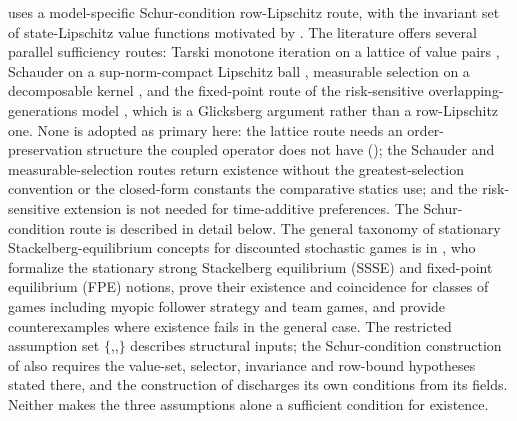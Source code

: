  uses a model-specific Schur-condition
row-Lipschitz route, with the invariant set of state-Lipschitz value functions
motivated by \citet{Curtat1996}. The literature offers several parallel sufficiency routes: Tarski
monotone iteration on a lattice of value pairs
\citep{BalbusReffettWozny2014JET,Vives1990}, Schauder on a sup-norm-compact
Lipschitz ball \citep{RaadWozny2019}, measurable selection on a decomposable
kernel \citep{HeSun2017}, and the fixed-point route of the risk-sensitive
overlapping-generations model \citep{JaskiewiczNowak2014}, which is a Glicksberg argument rather than a row-Lipschitz one. None is adopted as primary
here: the lattice route needs an order-preservation structure the coupled
operator does not have (); the Schauder and
measurable-selection routes return existence without the greatest-selection
convention or the closed-form constants the comparative statics use; and the
risk-sensitive extension is not needed for time-additive preferences. The
Schur-condition route is described in detail below. The general taxonomy of stationary
Stackelberg-equilibrium concepts for discounted stochastic games is
in \citet{Bucarey2023}, who formalize the stationary strong
Stackelberg equilibrium (SSSE) and fixed-point equilibrium (FPE)
notions, prove their existence and coincidence for classes of games
including myopic follower strategy and team games, and provide
counter\-examples where existence fails in the general case. The
restricted assumption set
$\{$,,$\}$
describes structural inputs; the Schur-condition construction of
 also requires the value-set, selector, invariance
and row-bound hypotheses stated there, and the construction of
 discharges its own conditions from its fields.
Neither makes the three assumptions alone a sufficient condition for
existence.

